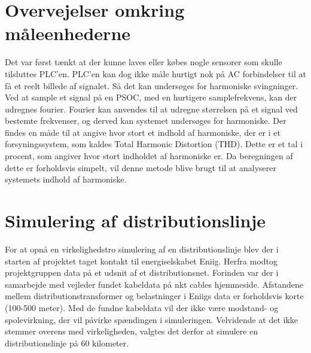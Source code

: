\section{Overvejelser omkring måleenhederne}
Det var først tænkt at der kunne laves eller købes nogle sensorer som skulle tilsluttes PLC'en. PLC'en kan dog ikke måle hurtigt nok på AC forbindelser til at få et reelt billede af signalet. Så det kan undersøges for harmoniske svingninger. Ved at sample et signal på en PSOC, med en hurtigere samplefrekvens, kan der udregnes fourier. Fourier kan anvendes til at udregne størrelsen på et signal ved bestemte frekvenser, og derved kan systemet undersøges for harmoniske. Der findes en måde til at angive hvor stort et indhold af harmoniske, der er i et forsyningssystem, som kaldes Total Harmonic Distortion (THD). Dette er et tal i procent, som angiver hvor stort indholdet af harmoniske er. Da beregningen af dette er forholdsvis simpelt, vil denne metode blive brugt til at analyserer systemets indhold af harmoniske. 

\section{Simulering af distributionslinje}
\label{sec:ForanalyseDisb}
For at opnå en virkelighedstro simulering af en distributionslinje blev der i starten af projektet taget kontakt til energiselskabet Eniig. Herfra modtog projektgruppen data på et udsnit af et distributionsnet. Forinden var der i samarbejde med vejleder fundet kabeldata på nkt cables hjemmeside. Afstandene mellem distributionstransformer og belastninger i Eniigs data er forholdsvis korte (100-500 meter). Med de fundne kabeldata vil der ikke være modstand- og spolevirkning, der vil påvirke spændingen i simuleringen. Velvidende at det ikke stemmer overens med virkeligheden, valgtes det derfor at simulere en distributionslinje på 60 kilometer. 



